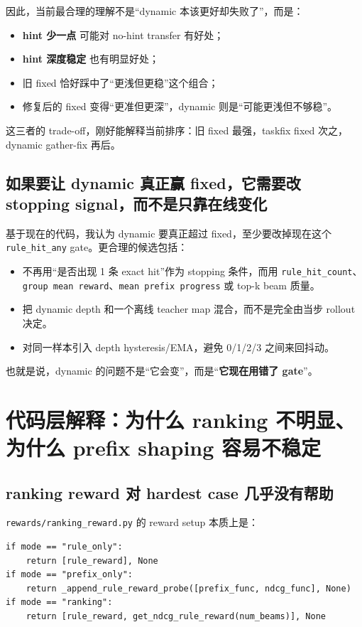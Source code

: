 \documentclass[a4paper]{article}
\begin{document}
因此，当前最合理的理解不是“dynamic 本该更好却失败了”，而是：
\begin{itemize}
\item \textbf{hint 少一点} 可能对 no-hint transfer 有好处；
\item \textbf{hint 深度稳定} 也有明显好处；
\item 旧 fixed 恰好踩中了“更浅但更稳”这个组合；
\item 修复后的 fixed 变得“更准但更深”，dynamic 则是“可能更浅但不够稳”。
\end{itemize}

这三者的 trade-off，刚好能解释当前排序：旧 fixed 最强，taskfix fixed 次之，dynamic gather-fix 再后。

\subsection{如果要让 dynamic 真正赢 fixed，它需要改 stopping signal，而不是只靠在线变化}

基于现在的代码，我认为 dynamic 要真正超过 fixed，至少要改掉现在这个 \texttt{rule\_hit\_any} gate。更合理的候选包括：
\begin{itemize}
\item 不再用“是否出现 1 条 exact hit”作为 stopping 条件，而用 \texttt{rule\_hit\_count}、\texttt{group mean reward}、\texttt{mean prefix progress} 或 top-k beam 质量。
\item 把 dynamic depth 和一个离线 teacher map 混合，而不是完全由当步 rollout 决定。
\item 对同一样本引入 depth hysteresis/EMA，避免 0/1/2/3 之间来回抖动。
\end{itemize}

也就是说，dynamic 的问题不是“它会变”，而是“\textbf{它现在用错了 gate}”。

\section{代码层解释：为什么 ranking 不明显、为什么 prefix shaping 容易不稳定}

\subsection{ranking reward 对 hardest case 几乎没有帮助}

\texttt{rewards/ranking\_reward.py} 的 reward setup 本质上是：

\begin{lstlisting}[caption={当前 reward mode 分支的核心定义},label={lst:reward-setup}]
if mode == "rule_only":
    return [rule_reward], None
if mode == "prefix_only":
    return _append_rule_reward_probe([prefix_func, ndcg_func], None)
if mode == "ranking":
    return [rule_reward, get_ndcg_rule_reward(num_beams)], None
\end{lstlisting}
\end{document}
